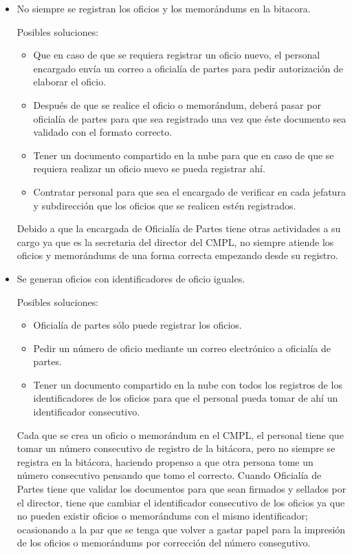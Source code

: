 \begin{itemize}
	\item No siempre se registran los oficios y los memorándums en la bitacora.
	
	Posibles soluciones:
	\begin{itemize}
		\item Que en caso de que se requiera registrar un oficio nuevo, el personal encargado envía un correo a oficialía de partes para pedir autorización de elaborar el oficio.
		\item Después de que se realice el oficio o memorándum, deberá pasar por oficialía de partes para que sea registrado una vez que éste documento sea validado con el formato correcto.
		\item Tener un documento compartido en la nube para que en caso de que se requiera realizar un oficio nuevo se pueda registrar ahí.
		\item Contratar personal para que sea el encargado de verificar en cada jefatura y subdirección que los oficios que se realicen estén registrados.
	\end{itemize}	
	
Debido a que la encargada de Oficialía de Partes tiene otras actividades a su cargo ya que es la secretaria del director del CMPL, no siempre atiende los oficios y memorándums de una forma correcta empezando desde su registro. 

	\item Se generan oficios con identificadores de oficio iguales.	
	
	Posibles soluciones:
	\begin{itemize}
		\item Oficialía de partes sólo puede registrar los oficios.
		\item Pedir un número de oficio mediante un correo electrónico a oficialía de partes.
		\item Tener un documento compartido en la nube con todos los registros de los identificadores de los oficios para que el personal pueda tomar de ahí un identificador consecutivo.

	\end{itemize}	
	
Cada que se crea un oficio o memorándum en el CMPL, el personal tiene que tomar un número consecutivo de registro de la bitácora, pero no siempre se registra en la bitácora, haciendo propenso a que otra persona tome un número consecutivo pensando que tomo el correcto. Cuando Oficialía de Partes tiene que validar los documentos para que sean firmados y sellados por el director, tiene que cambiar el identificador consecutivo de los oficios ya que no pueden existir oficios o memorándums con el mismo identificador; ocasionando a la par	que se tenga que volver a gastar papel para la impresión de los oficios o memorándums por corrección del número consegutivo.


\end{itemize}
